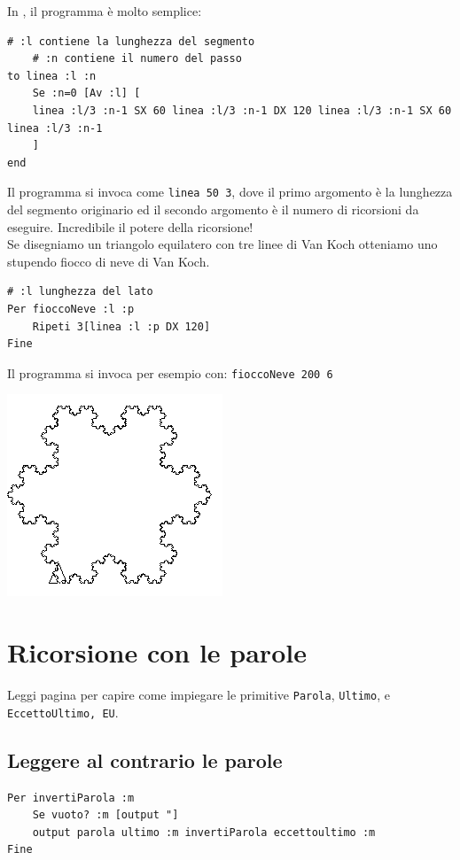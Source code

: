 In \logo, il programma è molto semplice:
\begin{lstlisting}[caption="Procedura ricorsiva per il disegno di un segmento frattale"]
	# :l contiene la lunghezza del segmento
	# :n contiene il numero del passo
to linea :l :n
	Se :n=0 [Av :l] [
	linea :l/3 :n-1 SX 60 linea :l/3 :n-1 DX 120 linea :l/3 :n-1 SX 60 linea :l/3 :n-1
	]
end
\end{lstlisting}
Il programma si invoca come \texttt{linea 50 3}, dove il primo argomento è la lunghezza del segmento originario ed il secondo argomento è il numero di ricorsioni da eseguire. Incredibile il potere della ricorsione!\\
Se disegniamo un triangolo equilatero con tre linee di Van Koch otteniamo uno stupendo fiocco di neve di Van Koch.
\begin{lstlisting}[caption="Fiocco di neve di Van Koch"]
	# :l lunghezza del lato
Per fioccoNeve :l :p
	Ripeti 3[linea :l :p DX 120]
Fine
\end{lstlisting}
Il programma si invoca per esempio con: \texttt{fioccoNeve 200 6}
\begin{center}
	\includegraphics{pics/flocon.png}
\end{center}




\section{Ricorsione con le parole}
Leggi pagina \pageref{liste-prim} per capire come impiegare le primitive \texttt{Parola}, \texttt{Ultimo}, e \texttt{EccettoUltimo, EU}.\\

\subsection{Leggere al contrario le parole}

\begin{lstlisting}[caption="Ricorsione per invertire l'ordine delle lettere in un parola"]
Per invertiParola :m
	Se vuoto? :m [output "]  
	output parola ultimo :m invertiParola eccettoultimo :m
Fine
\end{lstlisting}

